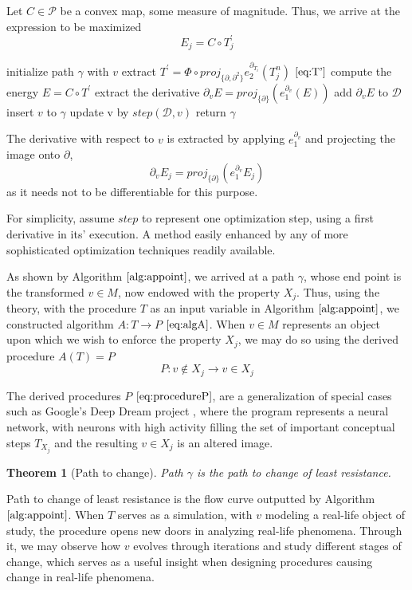 \documentclass{article}
\newcommand{\dP}{\mathcal{P}}
\newcommand{\D}{\partial}
\newtheorem{izrek}{Theorem}[section]
\begin{document}
Let $C\in\dP$ be a convex map, some measure of magnitude. Thus, we arrive at the expression to be maximized
\begin{equation}
E_j=C\circ T^\prime_j
\end{equation}
\begin{algorithm}[h]
\caption{Appoint property $X_j$ to $v\in M$}
\label{alg:appoint}
\begin{algorithmic}[1]
\State initialize path $\gamma$ with $v$
\State extract $T^\prime=\Phi\circ proj_{\{\D,\D^2\}}e^{\D_{T_i}}_2(T^n_j)$ $\eqref{eq:T'}$
\State compute the energy $E=C\circ T^\prime$
\State extract the derivative $\D_v E=proj_{\{\D\}}(e^{\D_v}_1(E))$
\State add $\D_v E$ to $\mathcal{D}$
\State insert $v$ to $\gamma$
\EndFor
\State update v by $step(\mathcal{D},v)$
\EndFor
\State return $\gamma$
\EndProcedure
\end{algorithmic}
\end{algorithm}
The derivative with respect to $v$ is extracted by applying $e^{\D_{v}}_1$ and projecting the image onto $\D$,
\begin{equation}
\D_vE_j=proj_{\{\D\}}(e^{\D_v}_1E_j)
\end{equation}
as it needs not to be differentiable for this purpose.

For simplicity, assume $step$ to represent one optimization step, using a first derivative in its' execution. A method easily enhanced by any of more sophisticated optimization techniques readily available. 

As shown by Algorithm $\ref{alg:appoint}$, we arrived at a path $\gamma$, whose end point is the transformed $v\in M$, now endowed with the property $X_j$. Thus, using the theory, with the procedure $T$ as an input variable in Algorithm $\ref{alg:appoint}$, we constructed algorithm $A: T\to P$ $\eqref{eq:algA}$. When $v\in M$ represents an object upon which we wish to enforce the property $X_j$, we may do so using the derived procedure $A(T)=P$
\begin{equation}\label{eq:procedureP}
P:v\notin X_j\to v\in X_j
\end{equation}

The derived procedures $P$ $\eqref{eq:procedureP}$, are a generalization of special cases such as Google's Deep Dream project \cite{DeepDream}, where the program represents a neural network, with neurons with high activity filling the set of important conceptual steps $T_{X_j}$ and the resulting $v\in X_j$ is an altered image.

\begin{izrek}[Path to change]
Path $\gamma$ is the path to change of least resistance.
\end{izrek}

Path to change of least resistance is the flow curve outputted by Algorithm $\ref{alg:appoint}$. When $T$ serves as a simulation, with $v$ modeling a real-life object of study, the procedure opens new doors in analyzing real-life phenomena. Through it, we may observe how $v$ evolves through iterations and study different stages of change, which serves as a useful insight when designing procedures causing change in real-life phenomena.

  \printbibliography
\end{document}
